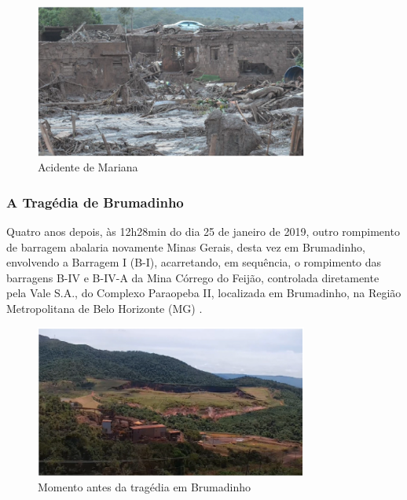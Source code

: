 \begin{figure}[htbp]
    \centering
    \includegraphics[width=0.8\textwidth]{figures/image37_acidente_mariana.png}
    \caption{Acidente de Mariana}
    \label{fig:acidente_mariana}
\end{figure}

\subsubsection{A Tragédia de Brumadinho}

Quatro anos depois, às 12h28min do dia 25 de janeiro de 2019, outro rompimento de barragem abalaria novamente Minas Gerais, desta vez em Brumadinho, envolvendo a Barragem I (B-I), acarretando, em sequência, o rompimento das barragens B-IV e B-IV-A da Mina Córrego do Feijão, controlada diretamente pela Vale S.A., do Complexo Paraopeba II, localizada em Brumadinho, na Região Metropolitana de Belo Horizonte (MG) \cite{minasgerais2024historico}.

\begin{figure}[htbp]
    \centering
    \includegraphics[width=0.8\textwidth]{figures/image33_momento_antes_brumadinho.png}
    \caption{Momento antes da tragédia em Brumadinho}
    \label{fig:momento_antes_brumadinho}
\end{figure}

